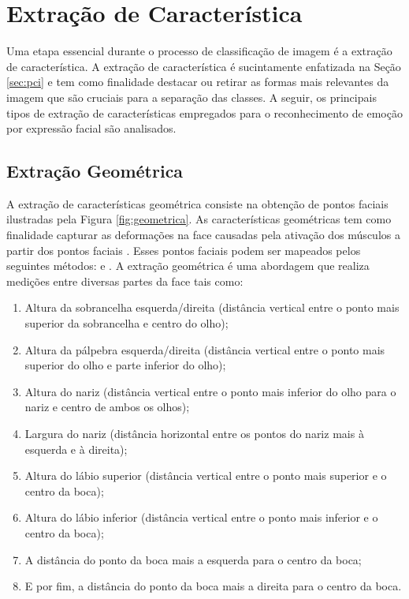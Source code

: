 

\section{Extração de Característica}\label{sec:edc}
Uma etapa essencial durante o processo de classificação de imagem é a extração de característica. A extração de característica é sucintamente enfatizada na Seção \ref{sec:pci} e tem como finalidade destacar ou retirar as formas mais relevantes da imagem que são cruciais para a separação das classes. A seguir, os principais tipos de extração de características empregados para o reconhecimento de emoção por expressão facial são analisados.

\subsection{Extração Geométrica}
A extração de características geométrica consiste na obtenção de pontos faciais ilustradas pela Figura \ref{fig:geometrica}. As características geométricas tem como finalidade capturar as deformações na face causadas pela ativação dos músculos a partir dos pontos faciais \citep{art11}. Esses pontos faciais podem ser mapeados pelos seguintes métodos: \cite{yu2016face} e \cite{yu2014consensus}.
A extração geométrica é uma abordagem que realiza medições entre diversas partes da face tais como:

\begin{enumerate}[label=(\roman*)]
\item Altura da sobrancelha esquerda/direita (distância vertical entre o ponto mais superior da sobrancelha e centro do olho);  
\item Altura da pálpebra esquerda/direita (distância vertical entre o ponto mais superior do olho e parte inferior do olho);  
\item Altura do nariz (distância vertical entre o ponto mais inferior do olho para o nariz e centro de ambos os olhos);  
\item Largura do nariz (distância horizontal entre os pontos do nariz mais à esquerda e à direita);  
\item Altura do lábio superior (distância vertical entre o ponto mais superior e o centro da boca); 
\item Altura do lábio inferior (distância vertical entre o ponto mais inferior e o centro da boca); 
\item A distância do ponto da boca mais a esquerda para o centro da boca; 
\item E por fim, a distância do ponto da boca mais a direita para o centro da boca.
\end{enumerate}

